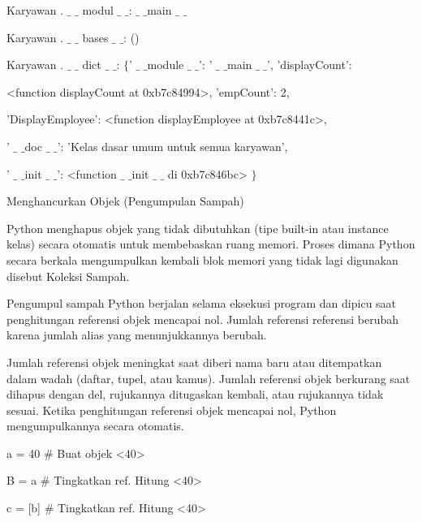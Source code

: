 \documentclass[a4paper,12pt]{report}
\begin{document}
\noindent 
Karyawan . $  \_  $ $  \_  $ modul $  \_  $ $  \_  $:  $  \_  $ $  \_  $main $  \_  $ $  \_  $ \par
\noindent 
Karyawan . $  \_  $ $  \_  $ bases $  \_  $ $  \_  $: () \par
\noindent 
Karyawan . $  \_  $ $  \_  $ dict $  \_  $ $  \_  $:  $  \{  $' $  \_  $ $  \_  $module $  \_  $ $  \_  $': ' $  \_  $ $  \_  $main $  \_  $ $  \_  $', 'displayCount': \par
\noindent 
<function displayCount at 0xb7c84994>, 'empCount': 2, \par
\noindent 
'DisplayEmployee': <function displayEmployee at 0xb7c8441c>, \par
\noindent 
' $  \_  $ $  \_  $doc $  \_  $ $  \_  $': 'Kelas dasar umum untuk semua karyawan', \par
\noindent 
' $  \_  $ $  \_  $init $  \_  $ $  \_  $': <function  $  \_  $ $  \_  $init $  \_  $ $  \_  $ di 0xb7c846bc> $  \}  $ \par
\vspace{12pt}
\noindent 
Menghancurkan Objek (Pengumpulan Sampah) \par
\vspace{12pt}
\noindent 
Python menghapus objek yang tidak dibutuhkan (tipe built-in atau instance kelas) secara otomatis untuk membebaskan ruang memori. Proses dimana Python secara berkala mengumpulkan kembali blok memori yang tidak lagi digunakan disebut Koleksi Sampah. \par
\vspace{12pt}
\noindent 
Pengumpul sampah Python berjalan selama eksekusi program dan dipicu saat penghitungan referensi objek mencapai nol. Jumlah referensi referensi berubah karena jumlah alias yang menunjukkannya berubah. \par
\vspace{12pt}
\noindent 
Jumlah referensi objek meningkat saat diberi nama baru atau ditempatkan dalam wadah (daftar, tupel, atau kamus). Jumlah referensi objek berkurang saat dihapus dengan del, rujukannya ditugaskan kembali, atau rujukannya tidak sesuai. Ketika penghitungan referensi objek mencapai nol, Python mengumpulkannya secara otomatis. \par
\vspace{12pt}
\noindent 
a = 40  $  \#  $ Buat objek <40> \par
\noindent 
B = a  $  \#  $ Tingkatkan ref. Hitung <40> \par
\noindent 
c = [b]  $  \#  $ Tingkatkan ref. Hitung <40> \par
\end{document}
